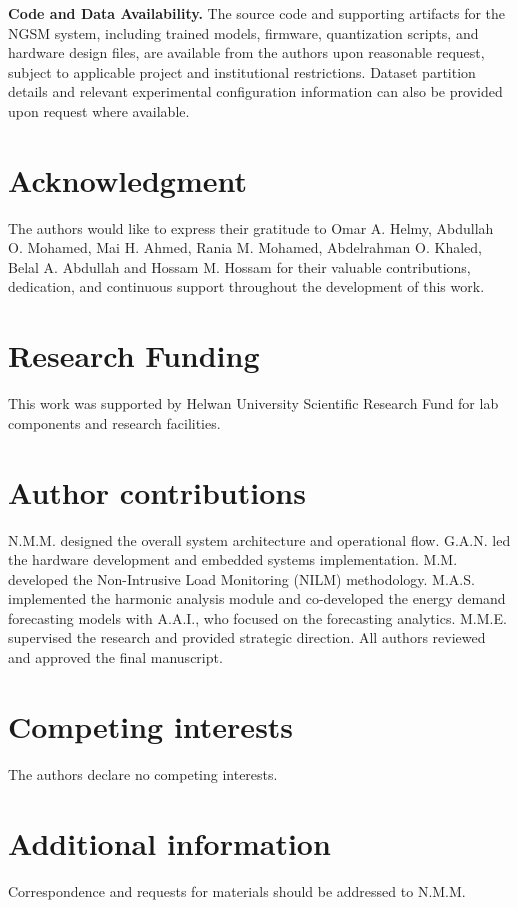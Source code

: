 \documentclass[fleqn,10pt]{wlscirep}
\begin{document}
\textbf{Code and Data Availability.} The source code and supporting artifacts for the NGSM system, including trained models, firmware, quantization scripts, and hardware design files, are available from the authors upon reasonable request, subject to applicable project and institutional restrictions. Dataset partition details and relevant experimental configuration information can also be provided upon request where available.


\section*{Acknowledgment}
The authors would like to express their gratitude to Omar A. Helmy, Abdullah O. Mohamed, Mai H. Ahmed, Rania M. Mohamed, Abdelrahman O. Khaled, Belal A. Abdullah and Hossam M. Hossam for their valuable contributions, dedication, and continuous support throughout the development of this work.

\section*{Research Funding}
This work was supported by Helwan University Scientific Research Fund for lab components and research facilities.

\section*{Author contributions}
N.M.M. designed the overall system architecture and operational flow. G.A.N. led the hardware development and embedded systems implementation. M.M. developed the Non-Intrusive Load Monitoring (NILM) methodology. M.A.S. implemented the harmonic analysis module and co-developed the energy demand forecasting models with A.A.I., who focused on the forecasting analytics. M.M.E. supervised the research and provided strategic direction. All authors reviewed and approved the final manuscript.

\section*{Competing interests}
The authors declare no competing interests.

\section*{Additional information}
Correspondence and requests for materials should be addressed to N.M.M.
\end{document}
